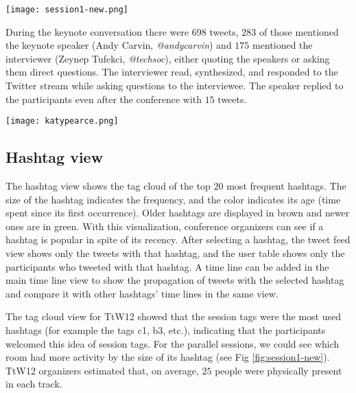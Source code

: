 \documentclass[conference,final]{IEEEtran}
\begin{document}
\begin{figure*}[htbp]
	\centering
		\texttt{[image: session1-new.png]}
		\setlength{\belowcaptionskip}{-10mm}
	\caption{Top: Session 1: b1,c1, and d1 sessions in parallel. The tag cloud shows low activity about session d1. Bottom: Session3: b3, c3 and d3. b3 had the least activity on Twitter.}
	\label{fig:session1-new}
\end{figure*}

During the keynote conversation there were $698$ tweets, $283$ of those mentioned the keynote speaker (Andy Carvin, \textit{@andycarvin}) and $175$ mentioned the interviewer (Zeynep Tufekci, \textit{@techsoc}), either quoting the speakers or asking them direct questions. The interviewer read, synthesized, and responded to the Twitter stream while asking questions to the interviewee. The speaker replied to the participants even after the conference with $15$ tweets.  
\begin{figure*}[htbp]
		\texttt{[image: katypearce.png]}
	\caption{CM after selecting the participant Katy Pearce, shown with blue line. The hashtag view shows hashtags in her tweets indicating her interest in several sessions.}
	\label{fig:katypearce}
\end{figure*}

\subsection{Hashtag view}
The hashtag view shows the tag cloud of the top $20$ most frequent hashtags. The size of the hashtag indicates the frequency, and the color indicates its age (time spent since its first occurrence). Older hashtags are displayed in brown and newer ones are in green. With this visualization, conference organizers can see if a hashtag is popular in spite of its recency. After selecting a hashtag, the tweet feed view shows only the tweets with that hashtag, and the user table shows only the participants who tweeted with that hashtag. A time line can be added in the main time line view to show the propagation of tweets with the selected hashtag and compare it with other hashtags' time lines in the same view.

The tag cloud view for TtW12 showed that the session tags were the most used hashtags (for example the tags c1, b3, etc.), indicating that the participants welcomed this idea of session tags. For the parallel sessions, we could see which room had more activity by the size of its hashtag (see Fig \ref{fig:session1-new}). TtW12 organizers estimated that, on average, $25$ people were physically present in each track.
\end{document}
